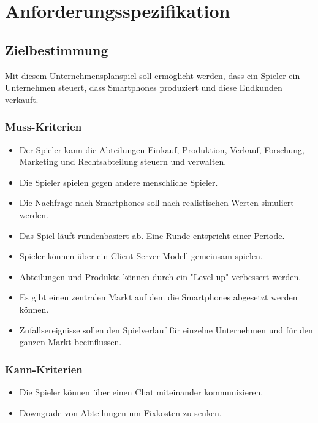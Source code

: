 
\chapter{Anforderungsspezifikation}

\section{Zielbestimmung}
Mit diesem Unternehmensplanspiel soll ermöglicht werden, dass ein Spieler ein Unternehmen steuert, dass Smartphones produziert und diese Endkunden verkauft.
\subsection{Muss-Kriterien}
\begin{itemize}
\item Der Spieler kann die Abteilungen Einkauf, Produktion, Verkauf, Forschung, Marketing und Rechtsabteilung steuern und verwalten.

\item Die Spieler spielen gegen andere menschliche Spieler.

\item Die Nachfrage nach Smartphones soll nach realistischen Werten simuliert werden.

\item Das Spiel läuft rundenbasiert ab. Eine Runde entspricht einer Periode.

\item Spieler können über ein Client-Server Modell gemeinsam spielen.

\item Abteilungen und Produkte können durch ein "Level up" verbessert werden.

\item Es gibt einen zentralen Markt auf dem die Smartphones abgesetzt werden können.

\item Zufallsereignisse sollen den Spielverlauf für einzelne Unternehmen und für den ganzen Markt beeinflussen.
\end{itemize}

\subsection{Kann-Kriterien}

\begin{itemize}
\item Die Spieler können über einen Chat miteinander kommunizieren.
\item Downgrade von Abteilungen um Fixkosten zu senken.
\end{itemize}

